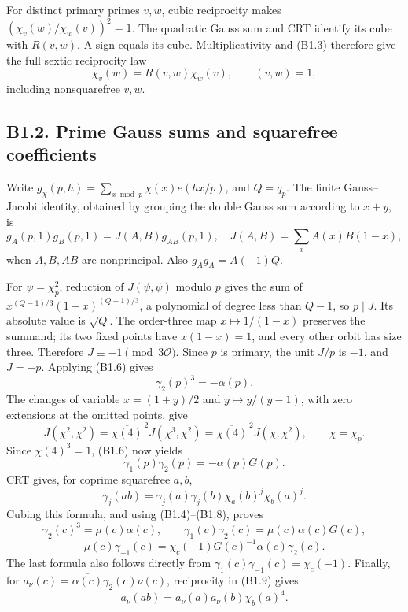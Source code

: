 \documentclass[11pt,a4paper]{article}
\begin{document}
For distinct primary primes \(v,\allowbreak{}w\), cubic reciprocity makes
\((\chi_v(w)/\chi_w(v))^2=1\). The quadratic Gauss sum and CRT identify
its cube with \(R(v,\allowbreak{}w)\). A sign equals its cube. Multiplicativity and
(B1.3) therefore give the full sextic reciprocity law \[
\chi_v(w)=R(v,w)\chi_w(v),\qquad (v,w)=1,
\tag{B1.5}
\] including nonsquarefree \(v,\allowbreak{}w\).

\hypertarget{b1.2.-prime-gauss-sums-and-squarefree-coefficients}{%
\subsection{B1.2. Prime Gauss sums and squarefree
coefficients}\label{b1.2.-prime-gauss-sums-and-squarefree-coefficients}}

Write \(g_\chi(p,\allowbreak{}h)=\sum_{x\bmod p}\chi(x)e(hx/p)\), and \(Q=q_p\). The
finite Gauss--Jacobi identity, obtained by grouping the double Gauss sum
according to \(x+y\), is \[
g_A(p,1)g_B(p,1)=J(A,B)g_{AB}(p,1),\quad
J(A,B)=\sum_xA(x)B(1-x),
\tag{B1.6}
\] when \(A,\allowbreak{}B,\allowbreak{}AB\) are nonprincipal. Also \(g_Ag_{\bar A}=A(-1)Q\).

For \(\psi=\chi_p^2\), reduction of \(J(\psi,\allowbreak{}\psi)\) modulo \(p\) gives
the sum of \(x^{(Q-1)/3}(1-x)^{(Q-1)/3}\), a polynomial of degree less
than \(Q-1\), so \(p\mid J\). Its absolute value is \(\sqrt Q\). The
order-three map \(x\mapsto1/(1-x)\) preserves the summand; its two fixed
points have \(x(1-x)=1\), and every other orbit has size three.
Therefore \(J\equiv-1\pmod{3\mathcal O}\). Since \(p\) is primary, the
unit \(J/p\) is \(-1\), and \(J=-p\). Applying (B1.6) gives \[
\gamma_2(p)^3=-\alpha(p).
\tag{B1.7}
\] The changes of variable \(x=(1+y)/2\) and \(y\mapsto y/(y-1)\), with
zero extensions at the omitted points, give \[
J(\chi^2,\chi^2)=\overline{\chi(4)}^{\,2}J(\chi^3,\chi^2)
=\overline{\chi(4)}^{\,2}J(\chi,\chi^2),\qquad \chi=\chi_p.
\] Since \(\chi(4)^3=1\), (B1.6) now yields \[
\gamma_1(p)\gamma_2(p)=-\alpha(p)G(p).
\tag{B1.8}
\] CRT gives, for coprime squarefree \(a,\allowbreak{}b\), \[
\gamma_j(ab)=\gamma_j(a)\gamma_j(b)\chi_a(b)^j\chi_b(a)^j.
\tag{B1.9}
\] Cubing this formula, and using (B1.4)--(B1.8), proves \[
\gamma_2(c)^3=\mu(c)\alpha(c),\qquad
\gamma_1(c)\gamma_2(c)=\mu(c)\alpha(c)G(c),
\] \[
\mu(c)\gamma_{-1}(c)=\chi_c(-1)G(c)^{-1}\overline{\alpha(c)}\gamma_2(c).
\tag{B1.10}
\] The last formula also follows directly from
\(\gamma_1(c)\gamma_{-1}(c)=\chi_c(-1)\). Finally, for
\(a_\nu(c)=\overline{\alpha(c)}\gamma_2(c)\nu(c)\), reciprocity in
(B1.9) gives \[
a_\nu(ab)=a_\nu(a)a_\nu(b)\chi_b(a)^4.
\tag{B1.11}
\]
\end{document}
